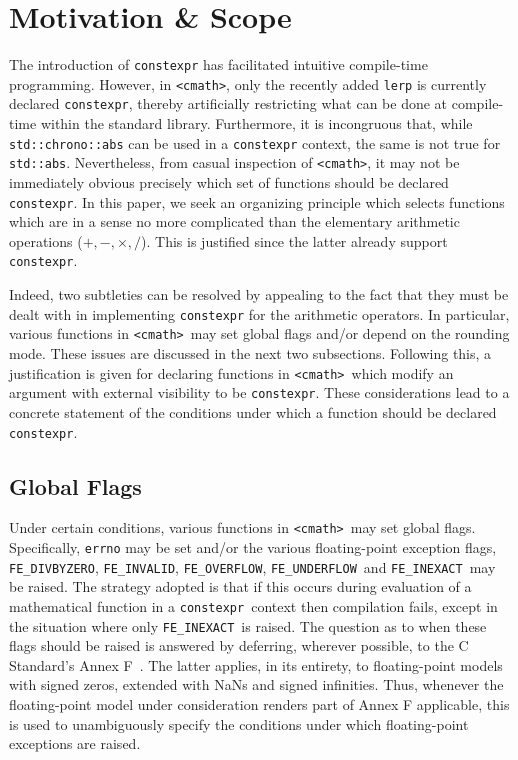 \documentclass[prd,twocolumn,amsmath,amssymb,nofootinbib,eqsecnum]{revtex4-1}
\newcommand{\constexpr}{\code{constexpr}\xspace}
\newcommand{\code}[1]{{\tt #1}}
\newcommand{\header}[1]{{\tt <#1>}}
\newcommand{\cmath}{\header{cmath}}
\newcommand{\FEINVALID}{{\tt FE\_INVALID}}
\newcommand{\FEDIVBYZERO}{{\tt FE\_DIVBYZERO}}
\newcommand{\FEINEXACT}{{\tt FE\_INEXACT}}
\newcommand{\FEUNDERFLOW}{{\tt FE\_UNDERFLOW}}
\newcommand{\FEOVERFLOW}{{\tt FE\_OVERFLOW}}
\newcommand{\Operators}{\ensuremath{+,-,\times,/}}
\begin{document}
\section{Motivation \& Scope}

The introduction of \constexpr has facilitated intuitive compile-time
programming. However, in \cmath, only the recently added \code{lerp} is currently declared \constexpr,
thereby artificially restricting what can be done at compile-time within the standard library. Furthermore, it
is incongruous that, while \code{std::chrono::abs} can be used in a \code{constexpr} context, the same is
not true for \code{std::abs}.
Nevertheless, from casual inspection of \cmath, it may
not be immediately obvious precisely which set of functions should be declared
\constexpr. In this paper, we seek an organizing principle which selects functions
which are in a sense no more complicated than the elementary arithmetic operations
(\Operators). This is justified since the latter already support \constexpr.

Indeed, two subtleties can be resolved by appealing to the fact that they must be dealt with in implementing \constexpr for the arithmetic operators. In particular, various functions in \cmath\ may set global flags and/or depend on the rounding mode. These issues are discussed in the next two subsections. Following this, a justification is given for declaring functions in \cmath\ which modify an argument with external visibility to be \constexpr. These considerations lead to a concrete statement of the conditions under which a function should be declared \constexpr.

\subsection{Global Flags}
\label{sec:global}

Under certain conditions, various functions in \cmath\ may set global flags.
Specifically, \code{errno} may be set and/or the various floating-point
exception flags, \FEDIVBYZERO, \FEINVALID, \FEOVERFLOW, \FEUNDERFLOW\ and
\FEINEXACT\ may be raised. The strategy adopted is that if this occurs during evaluation
of a mathematical function in a \constexpr\ context then compilation fails, except in the situation
where only \FEINEXACT\ is raised. The question as to when these flags should be raised is answered by deferring, wherever possible, to the C Standard's Annex F~\cite{CLang}. The latter applies, in its
entirety, to floating-point models with signed zeros, extended with NaNs and signed infinities. Thus,
whenever the floating-point model under consideration renders part of Annex F applicable, this is
used to unambiguously specify the conditions under which floating-point exceptions are raised.
\end{document}
